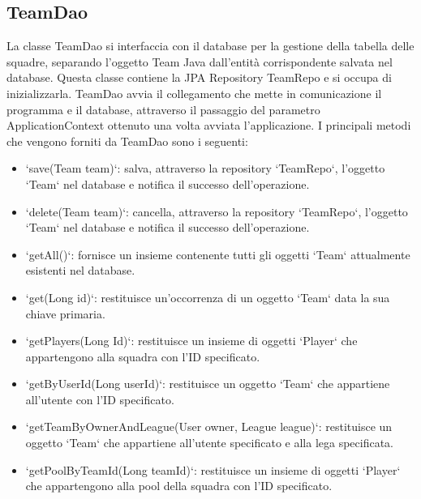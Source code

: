 \documentclass[twoside,openright,titlepage,fleqn,headinclude,12pt,a4paper,BCOR=5mm,footinclude]{scrbook}
\begin{document}
\subsection{TeamDao} 
La classe TeamDao si interfaccia con il database per la gestione della tabella delle squadre, separando l'oggetto Team Java dall'entità corrispondente salvata nel database. Questa classe contiene la JPA Repository TeamRepo e si occupa di inizializzarla. TeamDao avvia il collegamento che mette in comunicazione il programma e il database, attraverso il passaggio del parametro ApplicationContext ottenuto una volta avviata l'applicazione. I principali metodi che vengono forniti da TeamDao sono i seguenti:  \begin{itemize}
    \item `save(Team team)`: salva, attraverso la repository `TeamRepo`, l'oggetto `Team` nel database e notifica il successo dell'operazione. 
    \item `delete(Team team)`: cancella, attraverso la repository `TeamRepo`, l'oggetto `Team` nel database e notifica il successo dell'operazione. 
    \item `getAll()`: fornisce un insieme contenente tutti gli oggetti `Team` attualmente esistenti nel database. 
    \item `get(Long id)`: restituisce un'occorrenza di un oggetto `Team` data la sua chiave primaria. 
    \item `getPlayers(Long Id)`: restituisce un insieme di oggetti `Player` che appartengono alla squadra con l'ID specificato. 
    \item `getByUserId(Long userId)`: restituisce un oggetto `Team` che appartiene all'utente con l'ID specificato. 
    \item `getTeamByOwnerAndLeague(User owner, League league)`: restituisce un oggetto `Team` che appartiene all'utente specificato e alla lega specificata. 
    \item `getPoolByTeamId(Long teamId)`: restituisce un insieme di oggetti `Player` che appartengono alla pool della squadra con l'ID specificato.  
\end{itemize}
\end{document}
